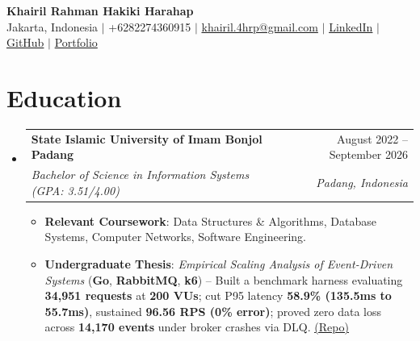 \documentclass[letterpaper,11pt]{article}
\makeatletter
\newcommand{\resumeItem}[1]{\item\small{#1}}
\newcommand{\resumeSubheading}[4]{
  \item
    \begin{tabular*}{\textwidth}[t]{l@{\extracolsep{\fill}}r}
      \textbf{#1} & #2 \\
      \textit{\small#3} & \textit{\small #4} \\
    \end{tabular*}\vspace{-2pt}
}
\newcommand{\resumeSubHeadingListStart}{\begin{itemize}[leftmargin=0in, label={}, itemsep=0.8pt, parsep=0pt, topsep=0.4pt]}
\newcommand{\resumeSubHeadingListEnd}{\end{itemize}\vspace{-2pt}}
\newcommand{\resumeItemListStart}{\begin{itemize}[leftmargin=12pt, label=\tiny$\bullet$, itemsep=0.8pt, parsep=0pt, topsep=0.4pt]}
\newcommand{\resumeItemListEnd}{\end{itemize}}
\makeatother
\begin{document}
\begin{center}\vspace*{-4pt}
    {\LARGE \bfseries Khairil Rahman Hakiki Harahap} \\[2pt]
    \footnotesize Jakarta, Indonesia $|$ +6282274360915 $|$ \href{mailto:khairil.4hrp@gmail.com}{khairil.4hrp@gmail.com} $|$ \href{https://linkedin.com/in/khairilrahman}{LinkedIn} $|$ \href{https://github.com/kyyril}{GitHub} $|$ \href{https://kiril.is-a.dev}{Portfolio}
\end{center}\vspace{-4pt}



\section{Education}
  \resumeSubHeadingListStart
    \resumeSubheading
      {State Islamic University of Imam Bonjol Padang}{August 2022 -- September 2026}
      {Bachelor of Science in Information Systems (GPA: 3.51/4.00)}{Padang, Indonesia}
      \resumeItemListStart
        \resumeItem{\textbf{Relevant Coursework}: Data Structures \& Algorithms, Database Systems, Computer Networks, Software Engineering.}
        \resumeItem{\textbf{Undergraduate Thesis}: \emph{Empirical Scaling Analysis of Event-Driven Systems} (\textbf{Go}, \textbf{RabbitMQ}, \textbf{k6}) -- Built a benchmark harness evaluating \textbf{34,951 requests} at \textbf{200 VUs}; cut P95 latency \textbf{58.9\% (135.5ms to 55.7ms)}, sustained \textbf{96.56 RPS (0\% error)}; proved zero data loss across \textbf{14,170 events} under broker crashes via DLQ. \href{https://repository.uinib.ac.id/34986/}{\underline{(Repo)}}}
      \resumeItemListEnd
  \resumeSubHeadingListEnd

\end{document}
